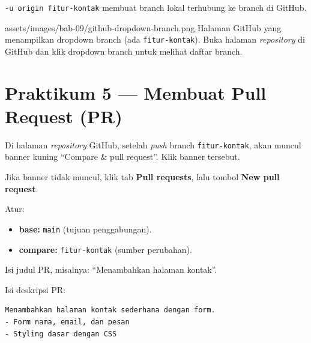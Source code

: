 \begin{catatan}
\texttt{-u origin fitur-kontak} membuat branch lokal terhubung ke branch di GitHub.
\end{catatan}

\begin{tangkapanlayar}
  {assets/images/bab-09/github-dropdown-branch.png}
  {Halaman GitHub yang menampilkan dropdown branch (ada \texttt{fitur-kontak}).}
  {Buka halaman \emph{repository} di GitHub dan klik dropdown branch untuk melihat daftar branch.}
\end{tangkapanlayar}

\section{Praktikum 5 --- Membuat Pull Request (PR)}
\label{sec:praktik-pr}

\begin{langkah}
  \item Di halaman \emph{repository} GitHub, setelah \emph{push} branch \texttt{fitur-kontak}, akan muncul banner kuning ``Compare \& pull request''. Klik banner tersebut.
  \item Jika banner tidak muncul, klik tab \textbf{Pull requests}, lalu tombol \textbf{New pull request}.
  \item Atur:
\end{langkah}

\begin{itemize}
  \item \textbf{base:} \texttt{main} (tujuan penggabungan).
  \item \textbf{compare:} \texttt{fitur-kontak} (sumber perubahan).
\end{itemize}

\begin{langkah}
  \item Isi judul PR, misalnya: ``Menambahkan halaman kontak''.
  \item Isi deskripsi PR:
\end{langkah}

\begin{lstlisting}[caption={Contoh deskripsi PR}, label={lst:pr-deskripsi}]
Menambahkan halaman kontak sederhana dengan form.
- Form nama, email, dan pesan
- Styling dasar dengan CSS
\end{lstlisting}

